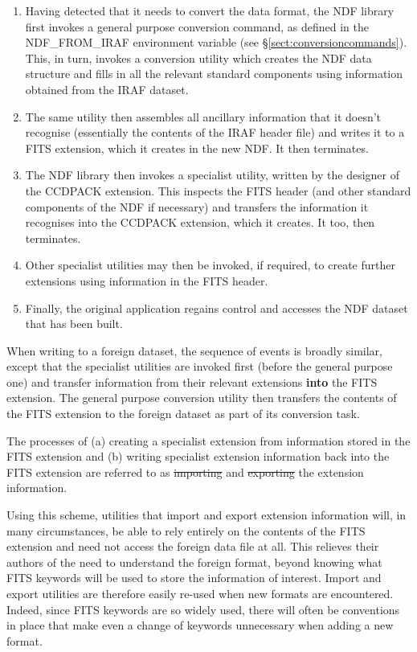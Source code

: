 \begin{enumerate}
\item Having detected that it needs to convert the data format, the
NDF library first invokes a general purpose conversion command, as
defined in the NDF\_FROM\_IRAF environment variable (see
\S\ref{sect:conversioncommands}). This, in turn, invokes a conversion
utility which creates the NDF data structure and fills in all the
relevant standard components using information obtained from the IRAF
dataset.

\item The same utility then assembles all ancillary information that
it doesn't recognise (essentially the contents of the IRAF header
file) and writes it to a FITS extension, which it creates in the new
NDF. It then terminates.

\item The NDF library then invokes a specialist utility, written by
the designer of the CCDPACK extension. This inspects the FITS header
(and other standard components of the NDF if necessary) and transfers
the information it recognises into the CCDPACK extension, which it
creates. It too, then terminates.

\item Other specialist utilities may then be invoked, if required, to
create further extensions using information in the FITS header.

\item Finally, the original application regains control and accesses
the NDF dataset that has been built.
\end{enumerate}

When writing to a foreign dataset, the sequence of events is broadly
similar, except that the specialist utilities are invoked first
(before the general purpose one) and transfer information from their
relevant extensions {\bf into} the FITS extension. The general purpose
conversion utility then transfers the contents of the FITS extension
to the foreign dataset as part of its conversion task.

The processes of (a) creating a specialist extension from information
stored in the FITS extension and (b) writing specialist extension
information back into the FITS extension are referred to as
\st{importing} and \st{exporting} the extension information.

Using this scheme, utilities that import and export extension
information will, in many circumstances, be able to rely entirely on
the contents of the FITS extension and need not access the foreign
data file at all. This relieves their authors of the need to
understand the foreign format, beyond knowing what FITS keywords will
be used to store the information of interest.  Import and export
utilities are therefore easily re-used when new formats are
encountered.  Indeed, since FITS keywords are so widely used, there
will often be conventions in place that make even a change of keywords
unnecessary when adding a new format.

